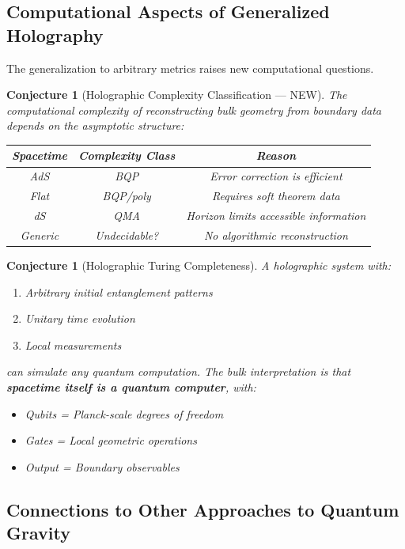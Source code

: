 \documentclass[12pt,a4paper]{article}
\newtheorem{conjecture}[theorem]{Conjecture}
\begin{document}
\subsection{Computational Aspects of Generalized Holography}

The generalization to arbitrary metrics raises new computational questions.

\begin{conjecture}[Holographic Complexity Classification --- NEW]
The computational complexity of reconstructing bulk geometry from boundary data depends on the asymptotic structure:
\begin{center}
\renewcommand{\arraystretch}{1.4}
\begin{tabular}{c|c|c}
\textbf{Spacetime} & \textbf{Complexity Class} & \textbf{Reason} \\
\hline
AdS & BQP & Error correction is efficient \\
Flat & BQP/poly & Requires soft theorem data \\
dS & QMA & Horizon limits accessible information \\
Generic & Undecidable? & No algorithmic reconstruction
\end{tabular}
\end{center}
\end{conjecture}

\begin{conjecture}[Holographic Turing Completeness]
A holographic system with:
\begin{enumerate}
    \item Arbitrary initial entanglement patterns
    \item Unitary time evolution
    \item Local measurements
\end{enumerate}
can simulate any quantum computation. The bulk interpretation is that \textbf{spacetime itself is a quantum computer}, with:
\begin{itemize}
    \item Qubits = Planck-scale degrees of freedom
    \item Gates = Local geometric operations
    \item Output = Boundary observables
\end{itemize}
\end{conjecture}

\subsection{Connections to Other Approaches to Quantum Gravity}
\end{document}
